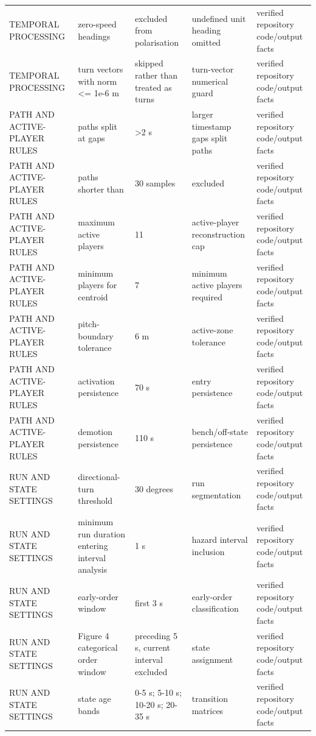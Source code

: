 \begin{tabular}{lllll}
TEMPORAL PROCESSING & zero-speed headings & excluded from polarisation & undefined unit heading omitted & verified repository code/output facts \\
TEMPORAL PROCESSING & turn vectors with norm <= 1e-6 m & skipped rather than treated as turns & turn-vector numerical guard & verified repository code/output facts \\
PATH AND ACTIVE-PLAYER RULES & paths split at gaps & >2 s & larger timestamp gaps split paths & verified repository code/output facts \\
PATH AND ACTIVE-PLAYER RULES & paths shorter than & 30 samples & excluded & verified repository code/output facts \\
PATH AND ACTIVE-PLAYER RULES & maximum active players & 11 & active-player reconstruction cap & verified repository code/output facts \\
PATH AND ACTIVE-PLAYER RULES & minimum players for centroid & 7 & minimum active players required & verified repository code/output facts \\
PATH AND ACTIVE-PLAYER RULES & pitch-boundary tolerance & 6 m & active-zone tolerance & verified repository code/output facts \\
PATH AND ACTIVE-PLAYER RULES & activation persistence & 70 s & entry persistence & verified repository code/output facts \\
PATH AND ACTIVE-PLAYER RULES & demotion persistence & 110 s & bench/off-state persistence & verified repository code/output facts \\
RUN AND STATE SETTINGS & directional-turn threshold & 30 degrees & run segmentation & verified repository code/output facts \\
RUN AND STATE SETTINGS & minimum run duration entering interval analysis & 1 s & hazard interval inclusion & verified repository code/output facts \\
RUN AND STATE SETTINGS & early-order window & first 3 s & early-order classification & verified repository code/output facts \\
RUN AND STATE SETTINGS & Figure 4 categorical order window & preceding 5 s, current interval excluded & state assignment & verified repository code/output facts \\
RUN AND STATE SETTINGS & state age bands & 0-5 s; 5-10 s; 10-20 s; 20-35 s & transition matrices & verified repository code/output facts \\
\bottomrule
\end{tabular}
